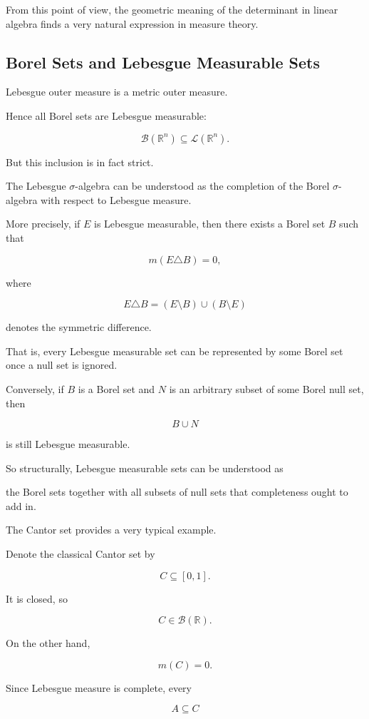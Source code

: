 \documentclass[11pt]{article}
\begin{document}
From this point of view, the geometric meaning of the determinant in linear algebra finds a very natural expression in measure theory.

\subsection{Borel Sets and Lebesgue Measurable Sets}

Lebesgue outer measure is a metric outer measure.

Hence all Borel sets are Lebesgue measurable:

\[
\mathcal{B}(\mathbb{R}^{n})\subseteq\mathcal{L}(\mathbb{R}^{n}).
\]

But this inclusion is in fact strict.

The Lebesgue $\sigma$-algebra can be understood as the completion of the Borel $\sigma$-algebra with respect to Lebesgue measure.

More precisely, if $E$ is Lebesgue measurable, then there exists a Borel set $B$ such that

\[
m(E\triangle B)=0,
\]

where

\[
E\triangle B=(E\setminus B)\cup(B\setminus E)
\]

denotes the symmetric difference.

That is, every Lebesgue measurable set can be represented by some Borel set once a null set is ignored.

Conversely, if $B$ is a Borel set and $N$ is an arbitrary subset of some Borel null set, then

\[
B\cup N
\]

is still Lebesgue measurable.

So structurally, Lebesgue measurable sets can be understood as

the Borel sets together with all subsets of null sets that completeness ought to add in.

The Cantor set provides a very typical example.

Denote the classical Cantor set by

\[
C\subseteq[0,1].
\]

It is closed, so

\[
C\in\mathcal{B}(\mathbb{R}).
\]

On the other hand,

\[
m(C)=0.
\]

Since Lebesgue measure is complete, every

\[
A\subseteq C
\]
\end{document}
